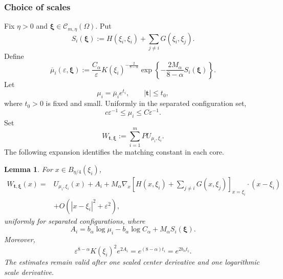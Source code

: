 \documentclass[11pt]{article}
\newtheorem{lemma}[theorem]{Lemma}
\numberwithin{equation}{section}
\begin{document}
\subsubsection{Choice of scales}

Fix $\eta>0$ and $\boldsymbol\xi\in\mathcal C_{m,\eta}(\Omega)$. Put
\begin{equation*}
S_i(\boldsymbol\xi)
:=H(\xi_i,\xi_i)+\sum_{j\ne i}G(\xi_i,\xi_j).
\end{equation*}
Define
\begin{equation}\label{eq:leading-scale}
\overline\mu_i(\varepsilon,\boldsymbol\xi)
:=\frac{C_\alpha}{\varepsilon}
K(\xi_i)^{-\frac{2}{8-\alpha}}
\exp\left\{-\frac{2M_\alpha}{8-\alpha}S_i(\boldsymbol\xi)\right\}.
\end{equation}
Let
\begin{equation}\label{eq:modulated-scale}
\mu_i=\overline\mu_i e^{t_i},
\qquad |\boldsymbol t|\leq t_0,
\end{equation}
where $t_0>0$ is fixed and small. Uniformly in the separated configuration set,
\begin{equation*}
c\varepsilon^{-1}\leq\mu_i\leq C\varepsilon^{-1}.
\end{equation*}
Set
\begin{equation*}
W_{\boldsymbol t,\boldsymbol\xi}
:=\sum_{i=1}^{m}PU_{\mu_i,\xi_i}.
\end{equation*}
The following expansion identifies the matching constant in each core.

\begin{lemma}
For $x\in B_{\eta/4}(\xi_i)$,
\begin{equation}\label{eq:local-W}
\begin{aligned}
W_{\boldsymbol t,\boldsymbol\xi}(x)
={}&U_{\mu_i,\xi_i}(x)+A_i
+M_\alpha\nabla_x\left[H(x,\xi_i)+\sum_{j\ne i}G(x,\xi_j)\right]_{x=\xi_i}\cdot(x-\xi_i)\\
&+O(|x-\xi_i|^2+\varepsilon^2),
\end{aligned}
\end{equation}
uniformly for separated configurations, where
\begin{equation}\label{eq:A-i}
A_i=b_\alpha\log\mu_i-b_\alpha\log C_\alpha+M_\alpha S_i(\boldsymbol\xi).
\end{equation}
Moreover,
\begin{equation}\label{eq:balance}
\varepsilon^{8-\alpha}K(\xi_i)^2e^{2A_i}
=e^{(8-\alpha)t_i}=e^{2b_\alpha t_i}.
\end{equation}
The estimates remain valid after one scaled center derivative and one
logarithmic scale derivative.
\end{lemma}
\end{document}
